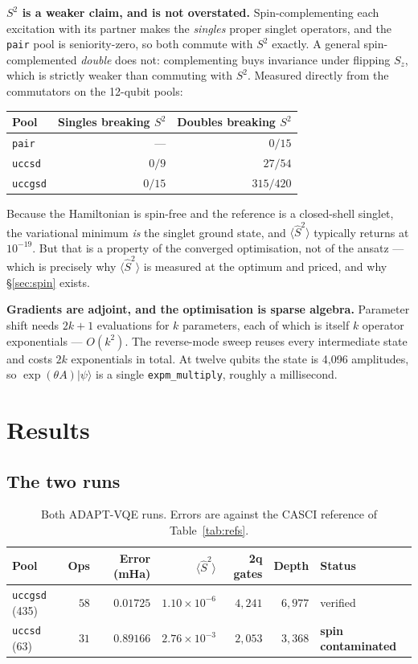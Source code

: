 \documentclass[11pt,a4paper]{article}
\newcommand{\Ssq}{\ensuremath{\langle \hat{S}^2 \rangle}}
\newcommand{\code}[1]{\texttt{\small #1}}
\begin{document}
\textbf{$S^2$ is a weaker claim, and is not overstated.} Spin-complementing each
excitation with its partner makes the \emph{singles} proper singlet operators,
and the \code{pair} pool is seniority-zero, so both commute with $S^2$ exactly.
A general spin-complemented \emph{double} does not: complementing buys
invariance under flipping $S_z$, which is strictly weaker than commuting with
$S^2$. Measured directly from the commutators on the 12-qubit pools:

\begin{center}
\small
\begin{tabular}{lrr}
\toprule
Pool & Singles breaking $S^2$ & Doubles breaking $S^2$ \\
\midrule
\code{pair}   & ---     & $0/15$ \\
\code{uccsd}  & $0/9$   & $27/54$ \\
\code{uccgsd} & $0/15$  & $315/420$ \\
\bottomrule
\end{tabular}
\end{center}

Because the Hamiltonian is spin-free and the reference is a closed-shell
singlet, the variational minimum \emph{is} the singlet ground state, and $\Ssq$
typically returns at $10^{-19}$. But that is a property of the converged
optimisation, not of the ansatz --- which is precisely why $\Ssq$ is measured at
the optimum and priced, and why \S\ref{sec:spin} exists.

\textbf{Gradients are adjoint, and the optimisation is sparse algebra.}
Parameter shift needs $2k+1$ evaluations for $k$ parameters, each of which is
itself $k$ operator exponentials --- $O(k^2)$. The reverse-mode sweep reuses
every intermediate state and costs $2k$ exponentials in total. At twelve qubits
the state is 4{,}096 amplitudes, so $\exp(\theta A)|\psi\rangle$ is a single
\code{expm\_multiply}, roughly a millisecond.

\section{Results}

\subsection{The two runs}

\begin{table}[htbp]
\centering
\caption{Both ADAPT-VQE runs. Errors are against the CASCI reference of
Table~\ref{tab:refs}.}
\label{tab:runs}
\small
\begin{tabular}{lrrrrrl}
\toprule
Pool & Ops & Error (mHa) & $\Ssq$ & 2q gates & Depth & Status \\
\midrule
\code{uccgsd} (435) & $58$ & $\mathbf{0.01725}$ & $1.10\times10^{-6}$ & $4{,}241$ & $6{,}977$ & verified \\
\code{uccsd} (63)   & $31$ & $0.89166$         & $2.76\times10^{-3}$ & $2{,}053$ & $3{,}368$ & \textbf{spin contaminated} \\
\bottomrule
\end{tabular}
\end{table}
\end{document}
